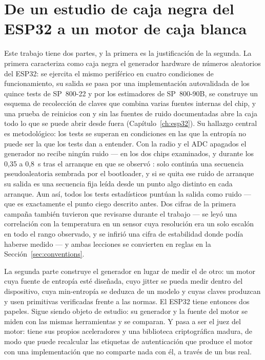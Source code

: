 \section{De un estudio de caja negra del ESP32 a un motor de caja blanca}
\label{sec:background}

Este trabajo tiene dos partes, y la primera es la justificación de la
segunda. La primera caracteriza como caja negra el generador hardware de
números aleatorios del ESP32: se ejercita el mismo periférico en cuatro
condiciones de funcionamiento, su salida se pasa por una implementación
autovalidada de los quince tests de SP~800-22 y por los estimadores de
SP~800-90B, se construye un esquema de recolección de claves que combina
varias fuentes internas del chip, y una prueba de reinicios con y sin las
fuentes de ruido documentadas abre la caja todo lo que se puede abrir
desde fuera (Capítulo~\ref{ch:esp32}). Su hallazgo central es
metodológico: los tests se superan en condiciones en las que la entropía
no puede ser la que los tests dan a entender. Con la radio y el ADC
apagados el generador no recibe ningún ruido --- en los dos chips
examinados, y durante los 0,35 a 0,8~s tras el arranque en que se
observó \meas{}: solo continúa una secuencia
pseudoaleatoria sembrada por el bootloader, y si se quita ese ruido de
arranque su salida es una secuencia fija leída desde un punto algo
distinto en cada arranque. Aun así, todos los tests estadísticos puntúan
la salida como ruido --- que es exactamente el punto ciego descrito antes. Dos cifras de
la primera campaña también tuvieron que revisarse durante el trabajo ---
se leyó una correlación con la temperatura en un sensor cuya resolución
era un solo escalón en todo el rango observado, y se infirió una cifra de
estabilidad donde podía haberse medido --- y ambas lecciones se
convierten en reglas en la Sección~\ref{sec:conventions}.

La segunda parte construye el generador en lugar de medir el de otro: un
motor cuya fuente de entropía esté diseñada, cuyo jitter se
pueda medir dentro del dispositivo, cuya min-entropía se deduzca de un modelo y
cuyas claves produzcan y usen primitivas verificadas frente a las normas.
El ESP32 tiene entonces dos papeles. Sigue siendo objeto de estudio: su
generador y la fuente del motor se miden con las mismas herramientas y se
comparan. Y pasa a ser el juez del motor: tiene sus propios aceleradores
y una biblioteca criptográfica madura, de modo que puede recalcular las
etiquetas de autenticación que produce el motor con una implementación
que no comparte nada con él, a través de un bus real.

